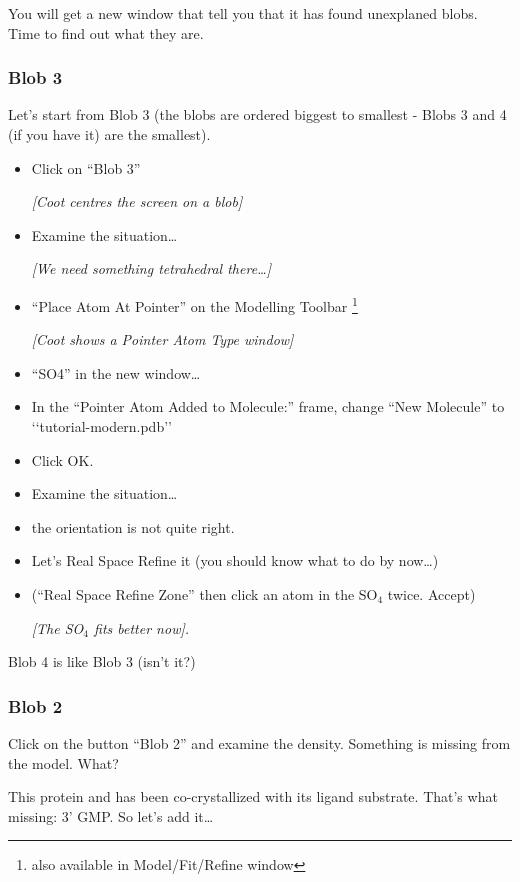 \documentclass{article}
\begin{document}
You will get a new window that tell you that it has found unexplaned
blobs.  Time to find out what they are.

\subsubsection{Blob 3}
Let's start from Blob 3 (the blobs are ordered biggest to smallest -
Blobs 3 and 4 (if you have it) are the smallest).

\begin{itemize}
\item Click on ``Blob 3''

\textsl{ [Coot centres the screen on a blob]}

\item Examine the situation\ldots

  \emph{[We need something tetrahedral there\ldots]}
  
\item \textsf{``Place Atom At Pointer''} on the Modelling 
 Toolbar \footnote{also available in Model/Fit/Refine window}

\textsl{ [Coot shows a Pointer Atom Type window]}

\item \textsf{``SO4''} in the new window\ldots
\item In the ``Pointer Atom Added to Molecule:'' frame, change ``New
  Molecule'' to `\textsf{`tutorial-modern.pdb''}
\item Click \textsf{OK}.
\item Examine the situation\ldots
\item the orientation is not quite right.
\item Let's Real Space Refine it (you should know what to do by now\ldots)
\item (\textsf{``Real Space Refine Zone''} then click an atom in the
  SO$_4$ twice.  Accept)

\textsl{[The SO$_4$ fits better now].}

\end{itemize}

Blob 4 is like Blob 3 (isn't it?)

\subsubsection{Blob 2}
Click on the button \textsf{``Blob 2''} and examine the density.
Something is missing from the model.  What?

This protein and has been co-crystallized with its ligand substrate.
That's what missing: 3' GMP.  So let's add it\ldots
\end{document}
